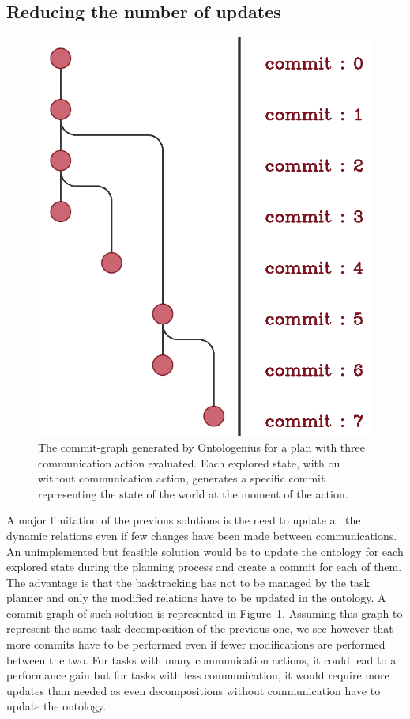 \subsection{Reducing the number of updates}

\begin{figure}[!ht]
\centering
\includegraphics[scale=0.25]{figures/chapter5/versioning_advance.png}
\caption{\label{fig:chap5_versioning_advance} The commit-graph generated by Ontologenius for a plan with three communication action evaluated. Each explored state, with ou without communication action, generates a specific commit representing the state of the world at the moment of the action. }
\end{figure}

A major limitation of the previous solutions is the need to update all the dynamic relations even if few changes have been made between communications. An unimplemented but feasible solution would be to update the ontology for each explored state during the planning process and create a commit for each of them. The advantage is that the backtracking has not to be managed by the task planner and only the modified relations have to be updated in the ontology. A commit-graph of such solution is represented in Figure~\ref{fig:chap5_versioning_advance}. Assuming this graph to represent the same task decomposition of the previous one, we see however that more commits have to be performed even if fewer modifications are performed between the two. For tasks with many communication actions, it could lead to a performance gain but for tasks with less communication, it would require more updates than needed as even decompositions without communication have to update the ontology.

